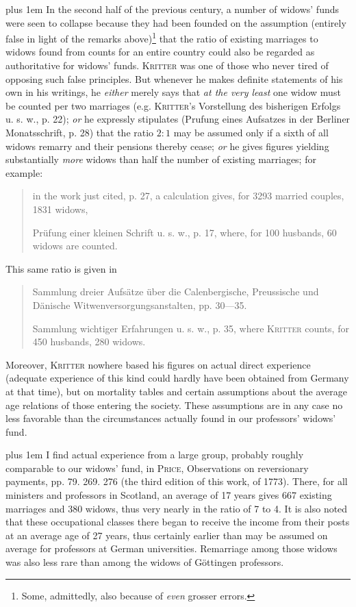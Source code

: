 {\rightskip=0pt plus 1em
In the second half of the previous century, a number of widows' funds were seen to collapse because they had been founded on the assumption (entirely false in light of the remarks above)\footnote{Some, admittedly, also because of \textit{even} grosser errors.} that the ratio of existing marriages to widows found from counts for an entire country could also be regarded as authoritative for widows' funds. \textsc{Kritter} was one of those who never tired of opposing such false principles. But whenever he makes definite statements of his own in his writings, he \textit{either} merely says that \textit{at the very least} one widow must be counted per two marriages (e.g. \textsc{Kritter}'s Vorstellung des bisherigen Erfolgs u. s. w., p. 22); \textit{or} he expressly stipulates (Prufung eines Aufsatzes in der Berliner Monatsschrift, p. 28) that the ratio \(2:1\) may be assumed only if a sixth of all widows remarry and their pensions thereby cease; \textit{or} he gives figures yielding substantially \textit{more} widows than half the number of existing marriages; for example:\par}

\begin{quote}
in the work just cited, p. 27, a calculation gives, for 3293 married couples, 1831 widows,

Prüfung einer kleinen Schrift u. s. w., p. 17, where, for 100 husbands, 60 widows are counted.
\end{quote}
\noindent This same ratio is given in
\begin{quote}
Sammlung dreier Aufsätze über die Calenbergische, Preussische und Dänische Witwenversorgungsanstalten, pp. 30—35.

Sammlung wichtiger Erfahrungen u. s. w., p. 35, where \textsc{Kritter} counts, for 450 husbands, 280 widows.
\end{quote}
\noindent\hspace*{\parindent}Moreover, \textsc{Kritter} nowhere based his figures on actual direct experience (adequate experience of this kind could hardly have been obtained from Germany at that time), but on mortality tables and certain assumptions about the average age relations of those entering the society. These assumptions are in any case no less favorable than the circumstances actually found in our professors' widows' fund.

{\rightskip=0pt plus 1em
I find actual experience from a large group, probably roughly comparable to our widows' fund, in \textsc{Price}, Observations on reversionary payments, pp. 79. 269. 276 (the third edition of this work, of 1773). There, for all ministers and professors in Scotland, an average of 17 years gives 667 existing marriages and 380 widows, thus very nearly in the ratio of 7 to 4. It is also noted that these occupational classes there began to receive the income from their posts at an average age of 27 years, thus certainly earlier than may be assumed on average for professors at German universities. Remarriage among those widows was also less rare than among the widows of Göttingen professors.\par}


